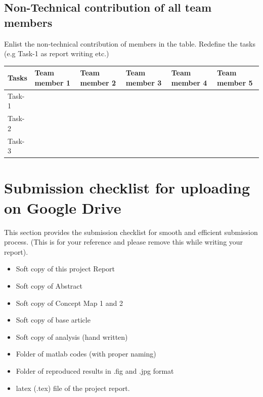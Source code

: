 \documentclass{article}
\begin{document}
\subsection{Non-Technical contribution of all team members }
Enlist the non-technical contribution of members in the table. Redefine the tasks (e.g Task-1 as report writing etc.)
\begin{table}[h]
\centering
\begin{tabular}{|l|l|l|l|l|l|}
\hline
Tasks  & Team member 1 & Team member 2 & Team member 3 & Team member 4 & Team member 5 \\ \hline
Task-1 &               &               &               &               &               \\ \hline
Task-2 &               &               &               &               &               \\ \hline
Task-3 &               &               &               &               &               \\ \hline
\end{tabular}
\end{table}


\section{Submission checklist for uploading on Google Drive}
This section provides the submission checklist for smooth and efficient submission process.  (This is for your reference and please remove this while writing your report).
\begin{itemize}

\item Soft copy of this project Report
\item Soft copy of Abstract
\item Soft copy of Concept Map 1 and 2
\item Soft copy of base article
\item Soft copy of analysis (hand written)
\item Folder of matlab codes (with proper naming)
\item Folder of reproduced results in .fig and .jpg format
\item latex (.tex) file of the project report.
\end{itemize}



\end{document}
